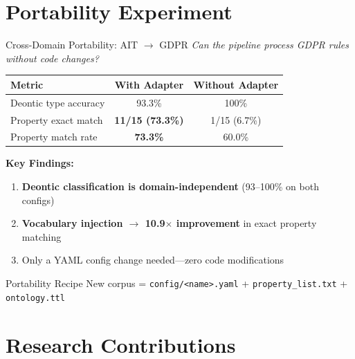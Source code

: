 \documentclass[aspectratio=169, 10pt]{beamer}
\begin{document}
\section{Portability Experiment}

\begin{frame}{Cross-Domain Portability: AIT $\rightarrow$ GDPR}
    \textit{Can the pipeline process GDPR rules without code changes?}
    
    \vspace{0.3cm}
    \begin{table}[]
        \centering
        \begin{tabular}{lcc}
            \toprule
            \textbf{Metric} & \textbf{With Adapter} & \textbf{Without Adapter} \\
            \midrule
            Deontic type accuracy & 93.3\% & 100\% \\
            Property exact match & \textbf{11/15 (73.3\%)} & 1/15 (6.7\%) \\
            Property match rate & \textbf{73.3\%} & 60.0\% \\
            \bottomrule
        \end{tabular}
    \end{table}
    
    \vspace{0.3cm}
    \textbf{Key Findings:}
    \begin{enumerate}
        \item \textbf{Deontic classification is domain-independent} (93--100\% on both configs)
        \item \textbf{Vocabulary injection $\rightarrow$ 10.9$\times$ improvement} in exact property matching
        \item Only a YAML config change needed---zero code modifications
    \end{enumerate}
    
    \vspace{0.2cm}
    \begin{exampleblock}{Portability Recipe}
        New corpus = \texttt{config/<name>.yaml} + \texttt{property\_list.txt} + \texttt{ontology.ttl}
    \end{exampleblock}
\end{frame}

\section{Research Contributions}
\end{document}
